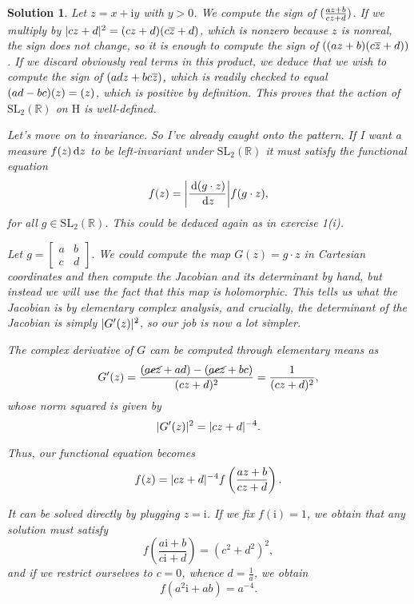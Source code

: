 \documentclass{article}
\theoremstyle{nonumberplain}
\newtheorem{sol}{Solution}
\newcommand{\R}{\mathbb{R}}
\newcommand{\I}{\mathrm{i}}
\newcommand{\conj}[1]{\overline{#1}}
\newcommand{\SL}{\mathrm{SL}}
\newcommand{\Hp}{\mathrm{H}}
\let\Im\relax
\DeclareMathOperator{\Im}{Im}
\DeclarePairedDelimiter{\abs}{\lvert}{\rvert}
\begin{document}
\begin{sol}
Let $z = x + \I y$ with $y > 0$. We compute the sign of $\Im(\frac{az+b}{cz+d})$. If we multiply by $\abs{cz+d}^2 = (cz+d)(c\conj z + d)$, which is nonzero because $z$ is nonreal, the sign does not change, so it is enough to compute the sign of $\Im((az+b)(c \conj z + d))$. If we discard obviously real terms in this product, we deduce that we wish to compute the sign of $\Im(adz + bc \conj z)$, which is readily checked to equal $(ad-bc) \Im(z) = \Im(z)$, which is positive by definition. This proves that the action of $\SL_2(\R)$ on $\Hp$ is well-defined.

\smallskip

Let's move on to invariance. So I've already caught onto the pattern. If I want a measure $f(z) \dl z$ to be left-invariant under $\SL_2(\R)$ it must satisfy the functional equation
\begin{equation}
f(z) = \abs*{\frac{\dl (g \cdot z)}{\dl z}} f(g \cdot z),
\end{equation}
for all $g \in \SL_2(\R)$. This could be deduced again as in exercise 1(i).

Let $g = \left[\begin{smallmatrix} a & b \\ c & d \end{smallmatrix}\right]$. We could compute the map $G(z) = g \cdot z$ in Cartesian coordinates and then compute the Jacobian and its determinant by hand, but instead we will use the fact that this map is holomorphic. This tells us what the Jacobian is by elementary complex analysis, and crucially, the determinant of the Jacobian is simply $\abs{G'(z)}^2$, so our job is now a lot simpler.

The complex derivative of $G$ cam be computed through elementary means as
\begin{equation}
G'(z) = \frac{(\cancel{acz} + ad) - (\cancel{acz} + bc)}{(cz+d)^2} = \frac1{(cz+d)^2},
\end{equation}
whose norm squared is given by
\begin{equation}
\abs{G'(z)}^2 = \abs{cz+d}^{-4}.
\end{equation}

Thus, our functional equation becomes
\begin{equation}\label{eq:f3}
f(z) = \abs{cz+d}^{-4} f\left(\frac{az+b}{cz+d}\right).
\end{equation}

It can be solved directly by plugging $z = \I$. If we fix $f(\I) = 1$, we obtain that any solution must satisfy
\begin{equation}
f\left(\frac{a\I+b}{c\I+d}\right) = (c^2 + d^2)^{2},
\end{equation}
and if we restrict ourselves to $c = 0$, whence $d = \frac1a$, we obtain
\begin{equation}
f(a^2 \I + ab) = a^{-4}.
\end{equation}


\end{sol}
\end{document}
